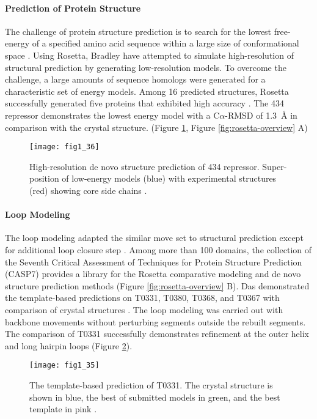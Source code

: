 \begin{refsection}
\paragraph{Prediction of Protein Structure}
The challenge of  protein structure prediction is to search for the
lowest free-energy of a specified amino acid sequence within a large size of
conformational space \cite{Bradley2005}. Using Rosetta, Bradley 
have attempted to simulate high-resolution of  structural prediction
by generating low-resolution models. To overcome the challenge, a large amounts
of sequence homologs were generated for a characteristic set of energy
models. Among 16 predicted structures, Rosetta successfully generated five
proteins that exhibited high accuracy \cite{Bradley2005}. The 434 repressor
demonstrates the lowest energy model with a C$\alpha$-RMSD of
\SI{1.3}{\angstrom} in comparison with the crystal structure. (Figure
\ref{fig:434}, Figure \ref{fig:rosetta-overview} A)
\begin{figure}[htbp] \centering \texttt{[image: fig1\_36]}
    \caption[High-resolution de novo structure prediction of 434 repressor.
    Super-position of low-energy models (blue) with experimental structures
(red) showing core side chains.]{High-resolution de novo structure prediction
    of 434 repressor. Super-position of low-energy models (blue) with
    experimental structures (red) showing core side chains \cite{Bradley2005}.}
    \label{fig:434}
\end{figure}

\paragraph{Loop Modeling}
The loop modeling adapted the similar move set to  structural
prediction except for additional loop closure step \cite{Das2008}. Among more
than 100 domains, the collection of the Seventh Critical Assessment of
Techniques for Protein Structure Prediction (CASP7) provides a library for the
Rosetta comparative modeling and de novo structure prediction methods
\cite{Das2008} (Figure \ref{fig:rosetta-overview} B). Das 
demonstrated the template-based predictions on T0331, T0380, T0368, and T0367
with comparison of crystal structures \cite{Das2007a}. The loop modeling was
carried out with backbone movements without perturbing segments outside the
rebuilt segments. The comparison of T0331 successfully demonstrates refinement
at the outer helix and long hairpin loops \cite{Das2007a} (Figure
\ref{fig:t0331}).
\begin{figure}[htbp] \centering \texttt{[image: fig1\_35]}
    \caption[The template-based prediction of T0331. The crystal structure is
    shown in blue, the best of submitted models in green, and the best template
in pink.]{The template-based prediction of T0331. The crystal structure is
    shown in blue, the best of submitted models in green, and the best template
    in pink \cite{Das2007a}.} \label{fig:t0331}
\end{figure}


\end{refsection}
